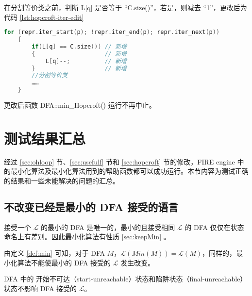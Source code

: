 在分割等价类之前，判断 L[q] 是否等于 “C.size()”，若是，则减去 “1”，更改后为代码 \ref{lst:hopcroft-iter-edit}

\lstset{style=mystyle}
\begin{lstlisting}[language=C++,label={lst:hopcroft-iter-edit},caption={ min-hop.cpp },firstnumber=100]
    for (repr.iter_start(p); !repr.iter_end(p); repr.iter_next(p))
    {
        if(L[q] == C.size()) // 新增
        {                    // 新增
            L[q]--;          // 新增
        }                    // 新增
        //分割等价类
        ……
    }
\end{lstlisting}

更改后函数 DFA::min\_Hopcroft() 运行不再中止。

\section{测试结果汇总}\label{sec:listall}

经过 \ref{sec:ohloop} 节、\ref{sec:usefulf} 节和 \ref{sec:hopcroft} 节的修改，FIRE engine 中的最小化算法及最小化算法用到的帮助函数都可以成功运行。本节内容为测试正确的结果和一些未能解决的问题的汇总。

\subsection{不改变已经是最小的 DFA 接受的语言}

接受一个 $\mathcal{L}$ 的最小的 DFA 是唯一的，最小的且接受相同 $\mathcal{L}$ 的 DFA 仅仅在状态命名上有差别\cite{book1}。因此最小化算法有性质 \ref{sec:keepMin} 。

\begin{property}\label{sec:keepMin}
    由定义 \ref{def:min} 可知，对于 DFA $M$，$\mathcal{L}(Min(M))= \mathcal{L}(M)$，同样的，最小化算法不能使最小的 DFA 接受的 $\mathcal{L}$ 发生改变。
\end{property}

\begin{remark}
    DFA 中的 开始不可达（start-unreachable）状态和陷阱状态（final-unreachable）状态不影响 DFA 接受的 $\mathcal{L}$。
\end{remark}




